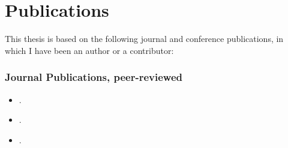 \documentclass[ngerman,UKenglish,table]{scrbook}
\begin{document}
%


\nobibliography*

% 
% 
% 

\frontmatter
 \dedication{For Siberia, which gave me my spirit and for my mom, who taught me how to govern it}

 
% 

\pagestyle{scrplain}



\chapter*{Publications}

This thesis is based on the following journal and conference publications, in which I have been an author or a contributor:


\subsection*{Journal Publications, peer-reviewed}

\begin{itemize}

\item {}.
\item {}.
\item {}.
\end{itemize}
\end{document}
